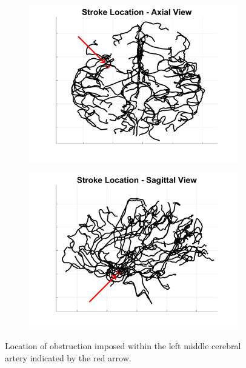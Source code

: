 \documentclass[11pt,english,a4paper,twoside,openright]{report}
\begin{document}
{{{{{{{\begin{figure}[h]
	\centering
	\begin{subfigure}[b]{0.49\textwidth}
		\includegraphics[width=\textwidth]{Chapter5/Chapter5_StrokeLocation1}
	\end{subfigure}
	\begin{subfigure}[b]{0.49\textwidth}
		\includegraphics[width=\textwidth]{Chapter5/Chapter5_StrokeLocation2}
	\end{subfigure}
	\caption[Location of obstruction imposed within the left middle cerebral artery]{Location of obstruction imposed within the left middle cerebral artery indicated by the red arrow.}
	\label{fig:StrokeLocation}
\end{figure}

}}}}}}}
\end{document}
